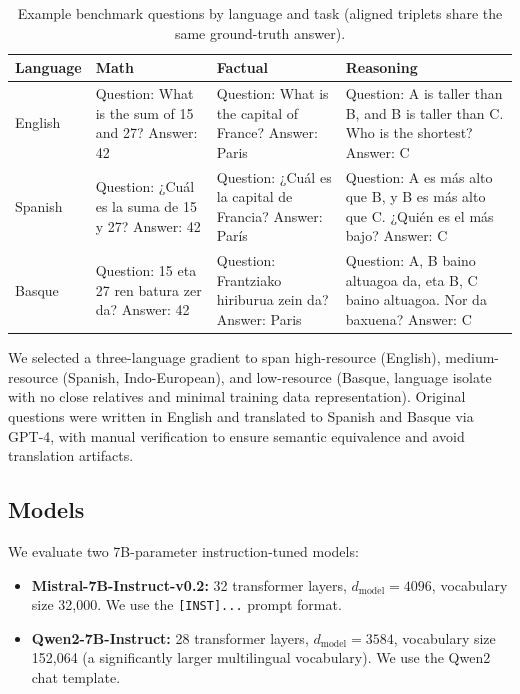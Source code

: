 \documentclass[10pt]{article}
\begin{document}
\begin{table}[H]
\centering
\caption{Example benchmark questions by language and task (aligned triplets share the same ground-truth answer).}
\label{tab:benchmark_examples}
\small
\begin{tabular}{@{}l p{3.6cm} p{3.6cm} p{3.8cm} @{}}
\toprule
\textbf{Language} & \textbf{Math} & \textbf{Factual} & \textbf{Reasoning} \\
\midrule
English
  & Question: What is the sum of 15 and 27? Answer: 42
  & Question: What is the capital of France? Answer: Paris
  & Question: A is taller than B, and B is taller than C. Who is the shortest? Answer: C \\
\addlinespace
Spanish
  & Question: ¿Cuál es la suma de 15 y 27? Answer: 42
  & Question: ¿Cuál es la capital de Francia? Answer: París
  & Question: A es más alto que B, y B es más alto que C. ¿Quién es el más bajo? Answer: C \\
\addlinespace
Basque
  & Question: 15 eta 27 ren batura zer da? Answer: 42
  & Question: Frantziako hiriburua zein da? Answer: Paris
  & Question: A, B baino altuagoa da, eta B, C baino altuagoa. Nor da baxuena? Answer: C \\
\bottomrule
\end{tabular}
\end{table}

We selected a three-language gradient to span high-resource (English), medium-resource
(Spanish, Indo-European), and low-resource (Basque, language isolate with no close
relatives and minimal training data representation). Original questions were written
in English and translated to Spanish and Basque via GPT-4, with manual verification
to ensure semantic equivalence and avoid translation artifacts.

\subsection{Models}

We evaluate two 7B-parameter instruction-tuned models:
\begin{itemize}[leftmargin=*,itemsep=1pt]
  \item \textbf{Mistral-7B-Instruct-v0.2:} 32 transformer layers, $d_\text{model}=4096$,
  vocabulary size 32,000. We use the \texttt{[INST]\allowbreak ...\allowbreak [/INST]} prompt format.
  \item \textbf{Qwen2-7B-Instruct:} 28 transformer layers, $d_\text{model}=3584$,
  vocabulary size 152,064 (a significantly larger multilingual vocabulary). We use
  the Qwen2 chat template.
\end{itemize}
\end{document}
